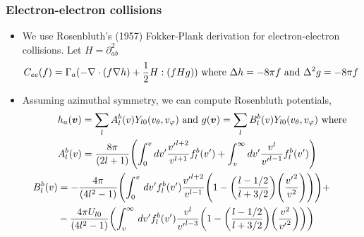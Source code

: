 \documentclass[mathserif, aspectratio=169]{beamer}
\newcommand{\vect}[1]{\boldsymbol{#1}}
\newcommand{\of}[1]{\mleft( #1 \mright)}
\newcommand{\diff}[1]{\, d#1}
\newcommand{\vtheta}{{v_{\theta}}}
\newcommand{\vphi}{v_{\varphi}}
\begin{document}
\begin{frame}
	\frametitle{Electron-electron collisions}
	\begin{itemize}
		\item We use Rosenbluth's (1957) Fokker-Plank derivation for electron-electron collisions. Let $H=\partial^2_{ab}$
		\begin{align}
			C_{ee}(f) &= \Gamma_a(-\nabla \cdot (f \nabla h ) + \frac{1}{2} H : \of{f H g}) \text{ where } \Delta h  = -8\pi f \text{ and } \Delta^2 g =-8\pi f	
		\end{align}
		\item Assuming azimuthal symmetry, we can compute Rosenbluth potentials, 
		\begin{align}
			& h_a\of{\vect{v}} = \sum_{l} A^{b}_l\of{v} Y_{l0}\of{\vtheta, \vphi}  \text{ and } g\of{\vect{v}} = \sum_{l} B^{b}_l\of{v} Y_{l0}\of{\vtheta, \vphi}\text{ where } \\
			& A^{b}_l\of{v} = \frac{8\pi}{(2l+1)}\of{\int_{0}^{v} dv^\prime \frac{{v^\prime}^{l+2}}{v^{l+1}} f^{b}_l\of{v^\prime} +  \int_{v}^{\infty} dv^\prime \frac{{v}^{l}}{{v^\prime}^{l-1}} f^{b}_l\of{v^\prime}}\\
			B^{b}_{l}\of{v} & = -\frac{4\pi}{(4l^2-1)} \of
			{
				\int_{0}^{v} \diff{v^\prime} f^{b}_l\of{v^\prime} \frac{{v^\prime}^{l+2}}{v^{l-1}} \of{1 - \of{\frac{l-1/2}{l+3/2}}\of{\frac{{v^\prime}^2 }{v^2}}} } + \nonumber\\
			&-\frac{4\pi U_{l0}}{(4l^2-1)} \of{
				\int_{v}^{\infty} \diff{v^\prime} f^{b}_l\of{v^\prime} \frac{{v}^{l}}{{v^\prime}^{l-3}} \of{1 - \of{\frac{l-1/2}{l+3/2}}\of{\frac{{v}^2 }{{v^\prime}^2}}}
			}
		\end{align}
	\end{itemize}
\end{frame}
\end{document}
